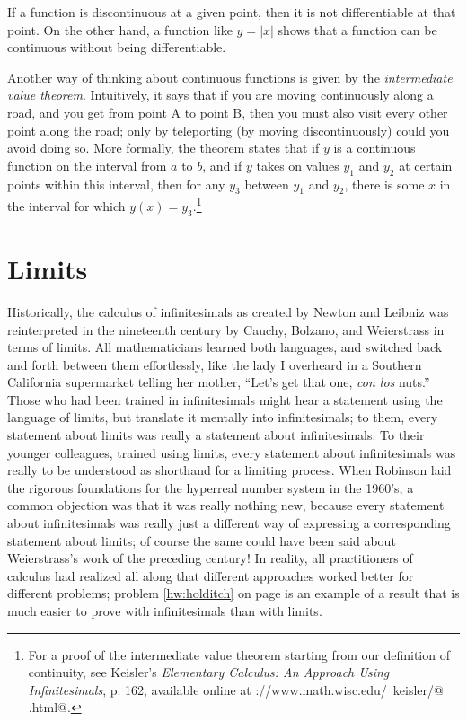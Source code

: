 If a function is discontinuous at a given point, then it is not differentiable at that point.
On the other hand, a function like $y=|x|$ shows that a function can be continuous without
being differentiable.

Another way of thinking about continuous functions is given by the
\emph{intermediate value theorem}.
Intuitively, it says that if you are moving continuously along a road, 
and you get from point A to point B, then you must also visit every other point
along the road; only by teleporting (by moving discontinuously) could you
avoid doing so. More formally, the theorem states
that if $y$ is a continuous function on the interval from $a$ to $b$,
and if $y$ takes on values $y_1$ and $y_2$ at certain points within this interval, then for any $y_3$ between $y_1$ and
$y_2$, there is some $x$ in the interval for which $y(x)=y_3$.\footnote{For a proof of the
intermediate value theorem starting from our definition of continuity, see Keisler's
\emph{Elementary Calculus: An Approach Using Infinitesimals}, p. 162, available online at
\verb@http://www.math.wisc.edu/~keisler/@ \verb@calc.html@.}

\section{Limits}\label{sec:limits}

Historically, the calculus of infinitesimals as created by Newton and Leibniz was reinterpreted
in the nineteenth century by Cauchy, Bolzano, and Weierstrass in terms of limits. All mathematicians
learned both languages, and switched back and forth between them effortlessly, like the lady I
overheard in a Southern California supermarket telling her mother, ``Let's get that one, \emph{con los} nuts.''
Those who had been trained in infinitesimals might hear a statement using the language of limits, but
translate it mentally into infinitesimals; to them, every statement about limits was really a statement
about infinitesimals. To their younger colleagues, trained using limits, every statement about infinitesimals
was really to be understood as shorthand for a limiting process. When Robinson laid the rigorous foundations
for the hyperreal number system in the 1960's, a common objection was that it was really nothing new, because
every statement about infinitesimals was really just a different way of expressing a corresponding statement
about limits; of course the same could have been said about Weierstrass's work of the preceding century!
In reality, all practitioners of calculus had realized all along that different approaches worked better for
different problems; problem \ref{hw:holditch} on page \pageref{hw:holditch} is an example of a result that
is much easier to prove with infinitesimals than with limits.

